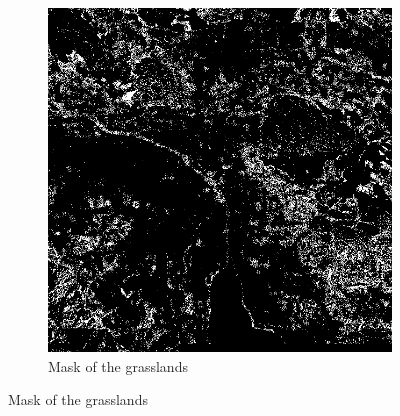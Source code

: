 \documentclass[letterpaper]{article}
\begin{document}
\begin{figure}
\begin{subfigure}{.22\textwidth}
        \includegraphics[width=.95\linewidth]{../images/greenery/green_areas.png}
        \caption[width=.2\textwidth]{Mask of the grasslands}
    \end{subfigure}


\end{figure}
\end{document}
